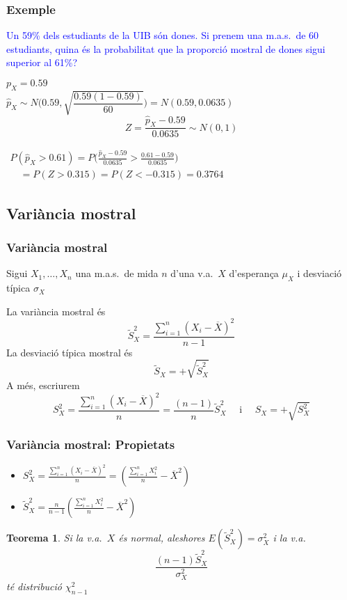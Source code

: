 \documentclass[12pt,t]{beamer}
\newcommand{\blue}[1]{\textcolor{blue}{#1}}
\renewcommand{\emph}[1]{{\color{red}#1}}
\theoremstyle{plain}
\newtheorem{teorema}{Teorema}
\theoremstyle{definition}
\begin{document}
\begin{frame}
\frametitle{Exemple}
\vspace*{-2ex}

\blue{Un  59\% dels estudiants de la UIB són dones. Si prenem una m.a.s.\ de 60 estudiants, quina és la probabilitat que la proporció mostral de dones sigui superior al 61\%?}
\medskip \pause

$p_X=0.59$\\
$\widehat{p}_X\!\sim\! N\Bigg(0.59,\sqrt{\dfrac{0.59(1\!-\!0.59)}{60}}\Bigg)\!\!=\!N(0.59,0.0635)$
$$
Z=\frac{\widehat{p}_X-0.59}{0.0635}\sim N(0,1)
$$

$\begin{array}{l} 
\displaystyle P(\widehat{p}_X>0.61)= P\Bigg(\frac{\widehat{p}_X-0.59}{0.0635} > \frac{0.61-0.59}{0.0635}\Bigg)\\
  \quad\displaystyle  = P(Z > 0.315)=P(Z<-0.315)=0.3764
   \end{array}$
   \medskip
   
\end{frame}


\subsection{Variància mostral}

\begin{frame}
\frametitle{Variància mostral}

Sigui $X_1,\ldots, X_n$ una m.a.s.\ de mida $n$ d'una v.a.\ $X$ d'esperança $\mu_X$ i desviació típica $\sigma_X$
\medskip

La \emph{variància mostral} és
$$
\widetilde{S}_{X}^2=\frac{\sum_{i=1}^n (X_{i}-\overline{X})^2}{n-1}
$$
La \emph{desviació típica mostral} és 
$$
\widetilde{S}_{X}=+\sqrt{\widetilde{S}_{X}^2}
$$
A més, escriurem
$$
S^2_{X}=\frac{\sum_{i=1}^n (X_{i}-\overline{X})^2}{n}=\frac{(n-1)}{n}\widetilde{S}^2_{X}\quad\mbox{ i }\quad S_X=+\sqrt{S_X^2}
$$
\end{frame}


\begin{frame}
\frametitle{Variància mostral: Propietats}
\begin{itemize}
\item $\displaystyle S^2_X=\frac{\sum_{i=1}^n (X_{i}-\overline{X})^2}{n}=\left(\frac{\sum_{i=1}^n
X_{i}^2}{n}-\overline{X}^2\right)$\medskip

\item $\displaystyle \widetilde{S}_{X}^2=\frac{n}{n-1}\left(\frac{\sum_{i=1}^n
X_{i}^2}{n}-\overline{X}^2\right)$\medskip

\end{itemize}
\pause

\begin{teorema}
Si la v.a.\ $X$ és normal, aleshores $E(\widetilde{S}_{X}^2)=\sigma_{X}^2$ i 
la v.a.
$$
\frac{(n-1)\widetilde{S}_{X}^2}{\sigma_{X}^2}
$$
té distribució $\chi_{n-1}^2$
\end{teorema}
\end{frame}
\end{document}
